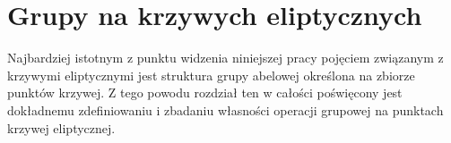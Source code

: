 \chapter{Grupy na krzywych eliptycznych}

Najbardziej istotnym z punktu widzenia niniejszej pracy
pojęciem związanym z krzywymi eliptycznymi
jest struktura grupy abelowej
określona na zbiorze punktów krzywej.
Z tego powodu rozdział ten w całości poświęcony jest
dokładnemu zdefiniowaniu i zbadaniu własności
operacji grupowej na punktach krzywej eliptycznej.




